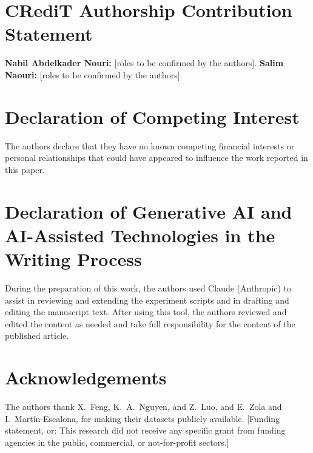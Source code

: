 \section*{CRediT Authorship Contribution Statement}

\textbf{Nabil Abdelkader Nouri:} [roles to be confirmed by the authors]. \textbf{Salim Naouri:} [roles to be confirmed by the authors].

\section*{Declaration of Competing Interest}

The authors declare that they have no known competing financial interests or personal relationships that could have appeared to influence the work reported in this paper.

\section*{Declaration of Generative AI and AI-Assisted Technologies in the Writing Process}

During the preparation of this work, the authors used Claude (Anthropic) to assist in reviewing and extending the experiment scripts and in drafting and editing the manuscript text. After using this tool, the authors reviewed and edited the content as needed and take full responsibility for the content of the published article.

\section*{Acknowledgements}

The authors thank X.~Feng, K.~A.~Nguyen, and Z.~Luo, and E.~Zola and I.~Mart\'in-Escalona, for making their datasets publicly available. [Funding statement, or: This research did not receive any specific grant from funding agencies in the public, commercial, or not-for-profit sectors.]
